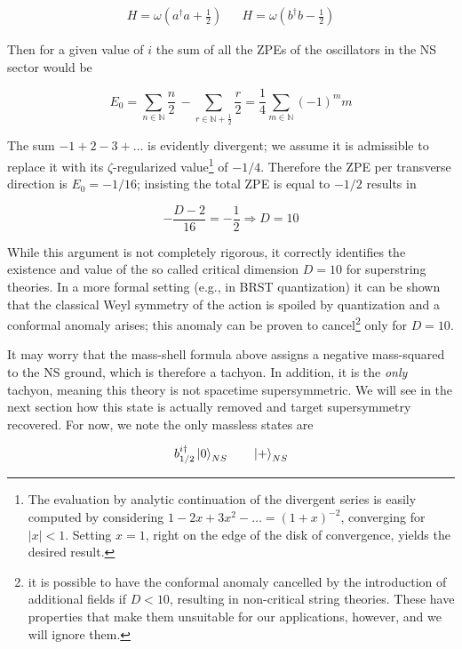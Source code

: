 \begin{align}
	H = \omega \left( a^\dagger a + \frac{1}{2} \right) && H = \omega \left( b^\dagger b - \frac{1}{2} \right)
	\label{}
\end{align}

Then for a given value of $i$ the sum of all the ZPEs of the oscillators in the NS sector would be

\begin{equation}
	E_0 =	\sum_{n\in \mathbb{N}} \frac{n}{2} \,- \sum_{r \in \mathbb{N}+\frac{1}{2}} \frac{r}{2} = \frac{1}{4} \sum_{m \in \mathbb{N}} (-1)^m m
	\label{}
\end{equation}

The sum $-1 + 2 - 3 + \ldots$ is evidently divergent; we assume it is admissible to replace it with its $\zeta$-regularized value\footnote{The evaluation by analytic continuation of the divergent series is easily computed by considering $1-2x + 3x^2 - \ldots = (1+x)^{-2}$, converging for $|x|<1$. Setting $x=1$, right on the edge of the disk of convergence, yields the desired result.} of $-1/4$. Therefore the ZPE per transverse direction is $E_0 = -1/16$; insisting the total ZPE is equal to $-1/2$ results in

\begin{equation}
	-\frac{D-2}{16} = -\frac{1}{2} \Rightarrow D = 10
	\label{}
\end{equation}

While this argument is not completely rigorous, it correctly identifies the existence and value of the so called critical dimension $D=10$ for superstring theories. In a more formal setting (e.g., in BRST quantization) it can be shown that the classical Weyl symmetry of the action is spoiled by quantization and a conformal anomaly arises; this anomaly can be proven to cancel\footnote{it is possible to have the conformal anomaly cancelled by the introduction of additional fields if $D<10$, resulting in non-critical string theories. These have properties that make them unsuitable for our applications, however, and we will ignore them.} only for $D=10$.

It may worry that the mass-shell formula above assigns a negative mass-squared to the NS ground, which is therefore a tachyon. In addition, it is the \emph{only} tachyon, meaning this theory is not spacetime supersymmetric. We will see in the next section how this state is actually removed and target supersymmetry recovered. For now, we note the only massless states are

\begin{equation}
	b_{1/2}^{i\dagger} \ket{0}_{NS} \quad \quad \ket{+}_{NS}
	\label{openmassless}
\end{equation}

